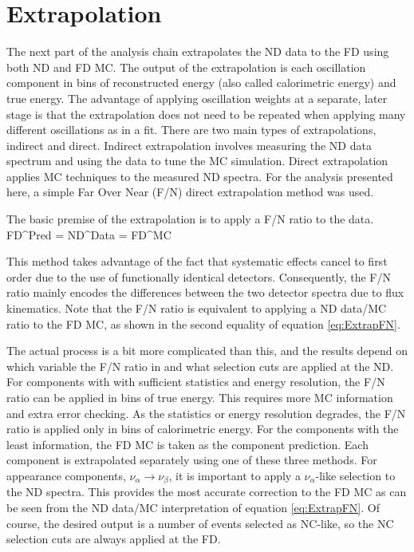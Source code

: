 \section{Extrapolation}
\label{sec:AnaExtrap}

The next part of the analysis chain extrapolates the ND data to the FD using both ND and FD MC. The output of the extrapolation is each oscillation component in bins of reconstructed energy (also called calorimetric energy) and true energy. The advantage of applying oscillation weights at a separate, later stage is that the extrapolation does not need to be repeated when applying many different oscillations as in a fit. There are two main types of extrapolations, indirect and direct. Indirect extrapolation involves measuring the ND data spectrum and using the data to tune the MC simulation. Direct extrapolation applies MC techniques to the measured ND spectra. For the analysis presented here, a simple Far Over Near (F/N) direct extrapolation method was used. 

The basic premise of the extrapolation is to apply a F/N ratio to the data.
\beq
\mbox{FD}^{Pred} = \mbox{ND}^{Data}  = \mbox{FD}^{MC} 
\label{eq:ExtrapFN}
\eeq

\n This method takes advantage of the fact that systematic effects cancel to first order due to the use of functionally identical detectors. Consequently, the F/N ratio mainly encodes the differences between the two detector spectra due to flux kinematics. Note that the F/N ratio is equivalent to applying a ND data/MC ratio to the FD MC, as shown in the second equality of equation \ref{eq:ExtrapFN}.

The actual process is a bit more complicated than this, and the results depend on which variable the F/N ratio in and what selection cuts are applied at the ND. For components with with sufficient statistics and energy resolution, the F/N ratio can be applied in bins of true energy. This requires more MC information and extra error checking. As the statistics or energy resolution degrades, the F/N ratio is applied only in bins of calorimetric energy. For the components with the least information, the FD MC is taken as the component prediction. Each component is extrapolated separately using one of these three methods. For appearance components, $\nu_\alpha \rightarrow \nu_\beta$, it is important to apply a $\nu_\alpha$-like selection to the ND spectra. This provides the most accurate correction to the FD MC as can be seen from the ND data/MC interpretation of equation \ref{eq:ExtrapFN}. Of course, the desired output is a number of events selected as NC-like, so the NC selection cuts are always applied at the FD.

